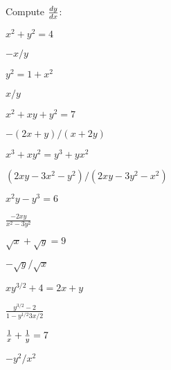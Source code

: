 \begin{exercises}

\noindent Compute $\frac{dy}{dx}$:
\twocol

\begin{exercise} $x^2 + y^2 = 4$
\begin{answer} $-x/y$
\end{answer}\end{exercise}

\begin{exercise} $y^2=1+x^2$
\begin{answer} $x/y$
\end{answer}\end{exercise}

\begin{exercise} $x^2+xy+y^2=7$
\begin{answer} $-(2x+y)/(x+2y)$
\end{answer}\end{exercise}

\begin{exercise} $x^3+xy^2=y^3+yx^2$
\begin{answer} $(2xy-3x^2-y^2)/(2xy-3y^2-x^2)$
\end{answer}\end{exercise}

\begin{exercise} $x^2y-y^3 = 6$
\begin{answer} $\frac{-2xy}{x^2-3y^2}$
\end{answer}\end{exercise}

\begin{exercise} $\sqrt{x} + \sqrt{y} = 9$
\begin{answer} $-\sqrt{y}/\sqrt{x}$
\end{answer}\end{exercise}

\begin{exercise} $xy^{3/2}+4 = 2x+y$
\begin{answer} $\frac{y^{3/2}-2}{1-y^{1/2}3x/2}$
\end{answer}\end{exercise}

\begin{exercise} ${1\over x} + {1\over y} = 7$
\begin{answer} $-y^2/x^2$
\end{answer}\end{exercise}

\endtwocol


\end{exercises}
